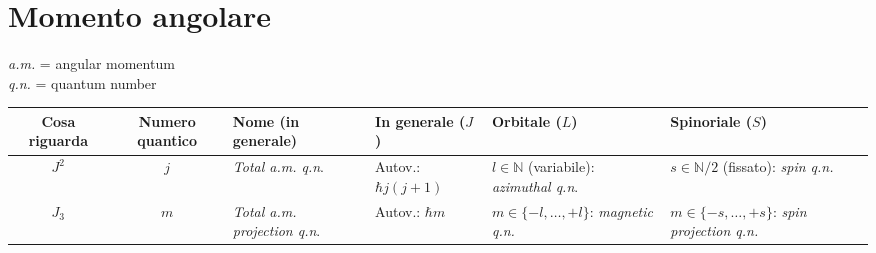 \documentclass[a4paper,10pt]{article}
\theoremstyle{definition}
\newcommand{\na}{\mathbb{N}} %
\theoremstyle{indentdefinition}
\theoremstyle{indenttheorem}
\theoremstyle{myremark}
\theoremstyle{indentgeneral}
\begin{document}
\section{Momento angolare}
\textit{a.m.} = angular momentum\\
\textit{q.n.} = quantum  number
\begin{table}[H] 
    \centering
    \begin{tabularx}{\textwidth}{|c|c|X|X|X|X|}\hline  
           Cosa riguarda &\textbf{Numero quantico}&\textbf{Nome} (in generale)&  \textbf{In generale} ($J$)&  \textbf{Orbitale} ($L$)& \textbf{Spinoriale} ($S$)\\ \hline  
           $J^2$&$j$&\textit{Total a.m. q.n}.&  Autov.: $\hbar j(j+1)$&  $l\in \na$ (variabile): \textit{azimuthal q.n}.& $s\in \na/2$ (fissato): \textit{spin q.n.}\\ \hline  
           $J_3$&$m$&\textit{Total a.m. projection q.n}.&  Autov.: $\hbar m$&  $m\in \{-l,\dots,+l\}$: \textit{magnetic q.n.}& $m\in \{-s,\dots,+s\}$: \textit{spin projection q.n.}\\ \hline 
    \end{tabularx}
 
\end{table}
\end{document}
